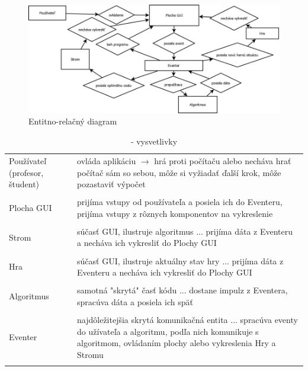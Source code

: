 \documentclass{article}
\begin{document}
\begin{figure}[H]
	\centering
	\includegraphics[width=\textwidth]{images/entity_relationship-diagram.jpg}
	\caption{Entitno-relačný diagram}
	\label{fig:entityrel}
\end{figure}
\begin{table}[H]
	\centering
	\begin{tabular}{p{8em} p{30em}}
	Používateľ (profesor, študent) &
	ovláda aplikáciu $\rightarrow$  hrá proti počítaču alebo necháva hrať počítač sám so sebou, môže si vyžiadať ďalší krok, môže pozastaviť výpočet \\ \\
	Plocha GUI &
	prijíma vstupy od používateľa a posiela ich do Eventeru, prijíma vstupy z rôznych komponentov na vykreslenie \\ \\
	Strom &
	súčasť GUI, ilustruje algoritmus ... prijíma dáta z Eventeru a necháva ich vykresliť do Plochy GUI \\ \\
	Hra &
	súčasť GUI, ilustruje aktuálny stav hry ... prijíma dáta z Eventeru a necháva ich vykresliť do Plochy GUI \\ \\
	Algoritmus &
	samotná "skrytá" časť kódu ... dostane impulz z Eventera, spracúva dáta a posiela ich späť \\ \\
	Eventer &
	najdôležitejšia skrytá komunikačná entita ... spracúva eventy do užívateľa a algoritmu, podľa nich komunikuje s algoritmom, ovládaním plochy alebo vykreslenia Hry a Stromu \\ \\
	\end{tabular}
	\caption{ - vysvetlivky}
\end{table}
\newpage
\end{document}
